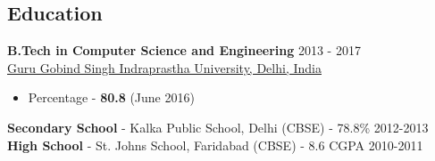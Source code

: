\documentclass[margin, centered]{res}
\begin{document}
\begin{resume}

\section{Education}
\textbf{B.Tech in Computer Science and Engineering} \hfill 2013 - 2017 \\
\href{http://ipu.ac.in/}{Guru Gobind Singh Indraprastha University, Delhi, India}
\begin{itemize}
 \item Percentage -  \textbf{80.8} (June 2016)
\end{itemize}
\textbf{Secondary School} - Kalka Public School, Delhi (CBSE) - 78.8\% \hfill 2012-2013\\
\textbf{High School} - St. Johns School, Faridabad (CBSE) - 8.6 CGPA \hfill 2010-2011\\
 

\end{resume}
\end{document}
